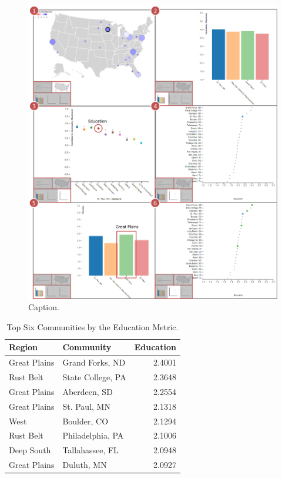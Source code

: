 \documentclass[11pt]{article}\usepackage{knitr}
\begin{document}
\begin{figure}[H]
\centering
\includegraphics[width=\textwidth]{images/greatplains.png}
\caption{\label{fig:greatplains} Caption.}
\end{figure}

\begin{table}[ht]
\centering
\begin{tabular}{llr}
  \hline
Region & Community & Education \\ 
  \hline
Great Plains & Grand Forks, ND & 2.4001 \\ 
  Rust Belt & State College, PA & 2.3648 \\ 
  Great Plains & Aberdeen, SD & 2.2554 \\ 
  Great Plains & St. Paul, MN & 2.1318 \\ 
  West & Boulder, CO & 2.1294 \\ 
  Rust Belt & Philadelphia, PA & 2.1006 \\ 
  Deep South & Tallahassee, FL & 2.0948 \\ 
  Great Plains & Duluth, MN & 2.0927 \\ 
   \hline
\end{tabular}
\caption{Top Six Communities by the Education Metric.} 
\label{tbl:edu_table}
\end{table}
\end{document}
